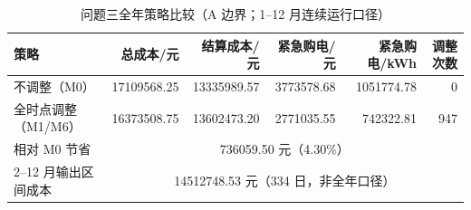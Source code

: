 \begin{table}[htbp]
\centering
\caption{问题三全年策略比较（A 边界；1--12 月连续运行口径）}\label{tab:q3-strategy-compare}
\small\setlength{\tabcolsep}{3pt}
\begin{tabular}{@{}lrrrrr@{}}
\toprule
策略 & 总成本/元 & 结算成本/元 & 紧急购电/元 & 紧急购电/kWh & 调整次数 \\
\midrule
不调整（M0） & 17109568.25 & 13335989.57 & 3773578.68 & 1051774.78 & 0 \\
全时点调整（M1/M6） & 16373508.75 & 13602473.20 & 2771035.55 & 742322.81 & 947 \\
\midrule
相对 M0 节省 & \multicolumn{5}{c}{736059.50 元（4.30\%）} \\
2--12 月输出区间成本 & \multicolumn{5}{c}{14512748.53 元（334 日，非全年口径）} \\
\bottomrule
\end{tabular}
\end{table}
